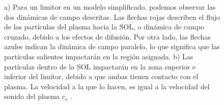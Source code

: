 \documentclass[../main.tex]{subfiles}
\begin{document}
	\begin{figure}[hbtp]
        \caption{a) Para un limitor en un modelo simplificado, podemos observar las dos dinámicas de campo descritas. Las flechas rojas describen el flujo de las partículas del plasma hacia la SOL, o dinámica de campo cruzado, debido a los efectos de difusión. Por otra lado, las flechas azules indican la dinámica de campo paralelo, lo que significa que las partículas salientes impactarán en la región asignada. b) Las partículas dentro de la SOL impactarán en la zona superior e inferior del limitor, debido a que ambas tienen contacto con el plasma. La velocidad a la que lo hacen, es igual a la velocidad del sonido del plasma $c_s$  .} \label{fig:sol}
    \end{figure}
	
   
	
\end{document}
